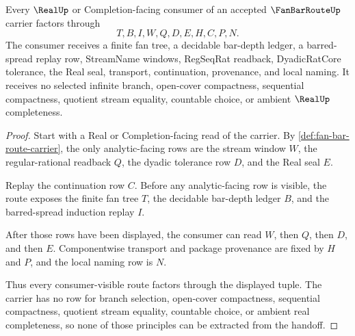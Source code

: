 \begin{theorem}
\label{thm:fan-bar-route-finite-bar-handoff}
Every $\RealUp$ or Completion-facing consumer of an accepted $\FanBarRouteUp$ carrier factors through
$$
T,B,I,W,Q,D,E,H,C,P,N.
$$
The consumer receives a finite fan tree, a decidable bar-depth ledger, a barred-spread replay row, StreamName windows, RegSeqRat readback, DyadicRatCore tolerance, the Real seal, transport, continuation, provenance, and local naming. It receives no selected infinite branch, open-cover compactness, sequential compactness, quotient stream equality, countable choice, or ambient $\RealUp$ completeness.
\end{theorem}
\begin{proof}
Start with a Real or Completion-facing read of the carrier. By \autoref{def:fan-bar-route-carrier}, the only analytic-facing rows are the stream window $W$, the regular-rational readback $Q$, the dyadic tolerance row $D$, and the Real seal $E$.

Replay the continuation row $C$. Before any analytic-facing row is visible, the route exposes the finite fan tree $T$, the decidable bar-depth ledger $B$, and the barred-spread induction replay $I$.

After those rows have been displayed, the consumer can read $W$, then $Q$, then $D$, and then $E$. Componentwise transport and package provenance are fixed by $H$ and $P$, and the local naming row is $N$.

Thus every consumer-visible route factors through the displayed tuple. The carrier has no row for branch selection, open-cover compactness, sequential compactness, quotient stream equality, countable choice, or ambient real completeness, so none of those principles can be extracted from the handoff.
\end{proof}



